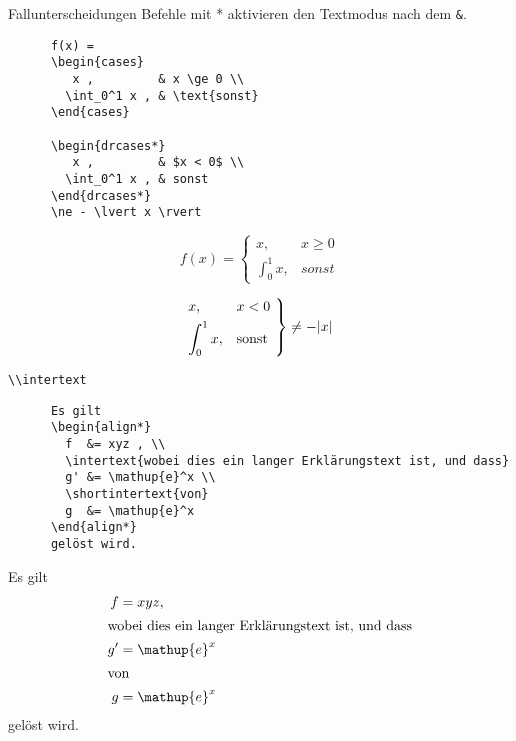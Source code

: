 \begin{frame}[fragile]{Fallunterscheidungen}
  Befehle mit * aktivieren den Textmodus nach dem \lstinline+&+.
  \begin{CodeExample}{0.55}
    \begin{lstlisting}
      f(x) =
      \begin{cases}
         x ,         & x \ge 0 \\
        \int_0^1 x , & \text{sonst}
      \end{cases}

      \begin{drcases*}
         x ,         & $x < 0$ \\
        \int_0^1 x , & sonst
      \end{drcases*}
      \ne - \lvert x \rvert
    \end{lstlisting}
  \CodeResult
    \begin{equation*}
      f(x) =
      \begin{cases}
         x ,         & x \ge 0 \\
        \int_0^1 x , & sonst
      \end{cases}
    \end{equation*}

    \vspace{5em}
    \begin{equation*}
      \begin{drcases*}
         x ,         & $x < 0$ \\
        \int_0^1 x , & sonst
      \end{drcases*}
      \ne - \lvert x \rvert
    \end{equation*}
  \end{CodeExample}
\end{frame}

\begin{frame}[fragile]{\lstinline+\\intertext+}
  \begin{CodeExample}{0.60}
    \begin{lstlisting}
      Es gilt
      \begin{align*}
        f  &= xyz , \\
        \intertext{wobei dies ein langer Erklärungstext ist, und dass}
        g' &= \mathup{e}^x \\
        \shortintertext{von}
        g  &= \mathup{e}^x
      \end{align*}
      gelöst wird.
    \end{lstlisting}
  \CodeResult
    Es gilt
    \begin{align*}
      f  &= xyz , \\
      \intertext{wobei dies ein langer Erklärungstext ist, und dass}
      g' &= \mathup{e}^x \\
      \shortintertext{von}
      g  &= \mathup{e}^x
    \end{align*}
    gelöst wird.
  \end{CodeExample}
\end{frame}

